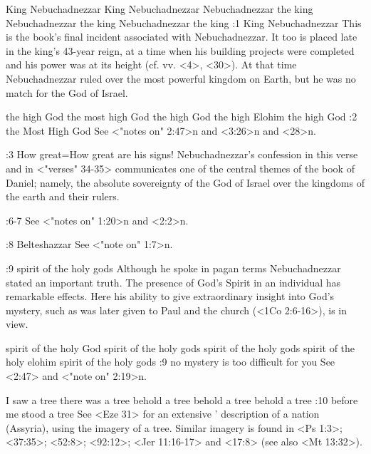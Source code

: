     {King Nebuchadnezzar} %
    {King Nebuchadnezzar} %
    {Nebuchadnezzar the king} %
    {Nebuchadnezzar the king} %
    {Nebuchadnezzar the king} %
:1 {King Nebuchadnezzar} This is the book's final incident associated with Nebuchadnezzar. It too is
placed late in the king's 43-year reign, at a time when his building projects were completed 
and his power was at its height (cf. vv. <4>, <30>). At that time Nebuchadnezzar ruled over the most
powerful kingdom on Earth, but he was no match for the God of Israel.

    {the high God} %
    {the most high God} %
    {the high God} %
    {the high Elohim} %
    {the high God} %
:2 {the Most High God} See <"notes on" 2:47>n and <3:26>n and <28>n.

:3 {How great}={How great are his signs!} Nebuchadnezzar's confession in this verse 
and in <"verses" 34-35> communicates one of the central themes of 
the book of Daniel; namely, the absolute sovereignty of the God of 
Israel over the kingdoms of the earth and their rulers.

:6-7 {}  See <"notes on" 1:20>n and <2:2>n. 

:8 {Belteshazzar} See <"note on" 1:7>n.

\ww {} %
    {} %
    {} %
    {} %
    {} %
    {} %
:9 {spirit of the holy gods} Although he spoke in pagan terms 
Nebuchadnezzar stated an important truth. The presence of God's 
Spirit in an individual has remarkable effects. Here his ability to 
give extraordinary insight into God's mystery, such as was later given to Paul and the church
(<1Co 2:6-16>), is in view.

    {spirit of the holy God} %
    {spirit of the holy gods} %
    {spirit of the holy gods} %
    {spirit of the holy elohim} %
    {spirit of the holy gods} %
:9 {no mystery is too difficult for you} See <2:47> and <"note on" 2:19>n.

    {I saw a tree} %
    {there was a tree} %
    {behold a tree} %
    {behold a tree} %
    {behold a tree} %
:10 {before me stood a tree} See <Eze 31> for an extensive ' description of a nation (Assyria), %
using the imagery of a tree. Similar imagery is found in <Ps 1:3>; <37:35>; <52:8>; <92:12>; <Jer
11:16-17> and <17:8>  (see also <Mt 13:32>).


